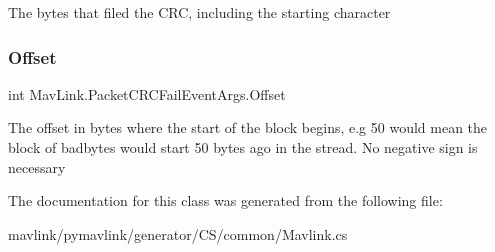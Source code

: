 The bytes that filed the C\+RC, including the starting character 

\mbox{\label{classMavLink_1_1PacketCRCFailEventArgs_a1313cf99a833ab9967fc1e6301f52eb0}} 
\subsubsection{\texorpdfstring{Offset}{Offset}}
{\footnotesize\ttfamily int Mav\+Link.\+Packet\+C\+R\+C\+Fail\+Event\+Args.\+Offset}



The offset in bytes where the start of the block begins, e.\+g 50 would mean the block of badbytes would start 50 bytes ago in the stread. No negative sign is necessary 



The documentation for this class was generated from the following file\+:\begin{DoxyCompactItemize}
\item 
mavlink/pymavlink/generator/\+C\+S/common/Mavlink.\+cs\end{DoxyCompactItemize}
